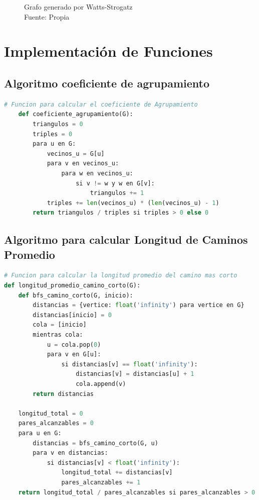 \begin{figure}[h]
\caption{Grafo generado por Watts-Strogatz\\Fuente: Propia}
\end{figure}

\section{Implementación de Funciones}

\subsection{Algoritmo coeficiente de agrupamiento}
\begin{lstlisting}[language=Python]
    # Funcion para calcular el coeficiente de Agrupamiento
    def coeficiente_agrupamiento(G):
        triangulos = 0
        triples = 0
        para u en G:
            vecinos_u = G[u]
            para v en vecinos_u:
                para w en vecinos_u:
                    si v != w y w en G[v]:
                        triangulos += 1
            triples += len(vecinos_u) * (len(vecinos_u) - 1)
        return triangulos / triples si triples > 0 else 0
\end{lstlisting}

\subsection{Algoritmo para calcular Longitud de Caminos Promedio}

\begin{lstlisting}[language=Python]
# Funcion para calcular la longitud promedio del camino mas corto
def longitud_promedio_camino_corto(G):
    def bfs_camino_corto(G, inicio):
        distancias = {vertice: float('infinity') para vertice en G}
        distancias[inicio] = 0
        cola = [inicio]
        mientras cola:
            u = cola.pop(0)
            para v en G[u]:
                si distancias[v] == float('infinity'):
                    distancias[v] = distancias[u] + 1
                    cola.append(v)
        return distancias

    longitud_total = 0
    pares_alcanzables = 0
    para u en G:
        distancias = bfs_camino_corto(G, u)
        para v en distancias:
            si distancias[v] < float('infinity'):
                longitud_total += distancias[v]
                pares_alcanzables += 1
    return longitud_total / pares_alcanzables si pares_alcanzables > 0 else float('infinity')
\end{lstlisting}

